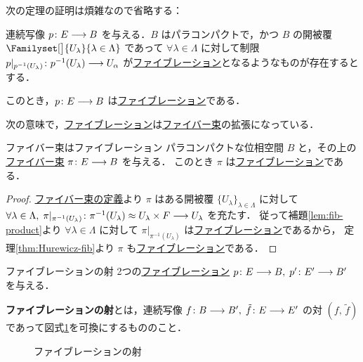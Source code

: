 \documentclass[algtopo_main]{subfiles}
\begin{document}
次の定理の証明は煩雑なので省略する：
\begin{mytheo}[label=thm:Hurewicz-fib]{}
    連続写像 $p\colon E \longrightarrow B$ を与える．$B$ はパラコンパクトで，かつ $B$ の開被覆 $\Familyset[\big]{U_\lambda}{\lambda\in \Lambda} $ であって 
    $\forall \lambda\in \Lambda$ に対して制限 $p|_{p^{-1}(U_\lambda)} \colon p^{-1}(U_\lambda) \longrightarrow U_\alpha$ が\hyperref[def:fibration]{ファイブレーション}となるようなものが存在するとする．

    このとき，$p \colon E \longrightarrow B$ は\hyperref[def:fibration]{ファイブレーション}である．
\end{mytheo}

次の意味で，\hyperref[def:fibration]{ファイブレーション}は\hyperref[def:FB]{ファイバー束}の拡張になっている．
\begin{mycol}[]{ファイバー束はファイブレーション}
    パラコンパクトな位相空間 $B$ と，その上の\hyperref[def:FB]{ファイバー束} $\pi \colon E \longrightarrow B$ を与える．
    このとき $\pi$ は\hyperref[def:fibration]{ファイブレーション}である．
\end{mycol}

\begin{proof}
    \hyperref[def:FB]{ファイバー束の定義}より $\pi$ はある開被覆 $\{U_\lambda\}_{\lambda \in \Lambda}$ に対して $\forall \lambda \in \Lambda,\; \pi|_{\pi^{-1}(U_\lambda)} \colon \pi^{-1}(U_\lambda) \approx U_\lambda \times F \longrightarrow U_\lambda$ を充たす．
    従って補題\ref{lem:fib-product}より $\forall \lambda \in \Lambda$ に対して $\pi|_{\pi^{-1}(U_\lambda)}$ は\hyperref[def:fibration]{ファイブレーション}であるから，
    定理\ref{thm:Hurewicz-fib}より $\pi$ も\hyperref[def:fibration]{ファイブレーション}である．
\end{proof}

\begin{mydef}[label=def:fib-morphism]{ファイブレーションの射}
    2つの\hyperref[def:fibration]{ファイブレーション} $p \colon E \longrightarrow B,\; p'\colon E' \longrightarrow B'$ を与える．

    \textbf{ファイブレーションの射}とは，連続写像 $f \colon B \longrightarrow B',\; \tilde{f} \colon E \longrightarrow E'$ の対 $(f,\, \tilde{f})$ であって図式\ref{cmtd:fib-morphism}を可換にするもののこと．
\end{mydef}

\begin{figure}[H]
    \centering
    \caption{ファイブレーションの射}
    \label{cmtd:fib-morphism}
\end{figure}%
\end{document}
